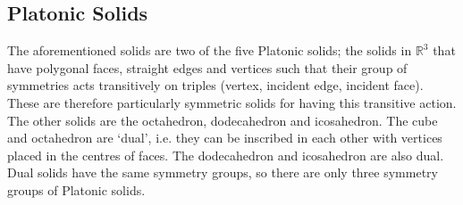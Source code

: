 \subsection{Platonic Solids}
The aforementioned solids are two of the five Platonic solids; the solids in \(\mathbb R^3\) that have polygonal faces, straight edges and vertices such that their group of symmetries acts transitively on triples (vertex, incident edge, incident face). These are therefore particularly symmetric solids for having this transitive action. The other solids are the octahedron, dodecahedron and icosahedron. The cube and octahedron are `dual', i.e. they can be inscribed in each other with vertices placed in the centres of faces. The dodecahedron and icosahedron are also dual. Dual solids have the same symmetry groups, so there are only three symmetry groups of Platonic solids.

